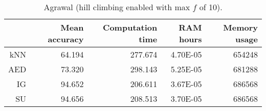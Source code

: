 \begin{table}[h]
\centering
\begin{tabular}{r|rrrr}
    & Mean accuracy  & Computation time & RAM hours & Memory usage \\ \hline
kNN & 64.194                   & 277.674          & 4.70E-05  & 654248       \\
AED & 73.320                   & 298.143          & 5.25E-05  & 681288       \\
IG  & 94.652                   & 206.611          & 3.67E-05  & 686568       \\
SU  & 94.656                   & 208.513          & 3.70E-05  & 686568      
\end{tabular}
\caption{Agrawal (hill climbing enabled with max $f$ of 10).}
\label{Table:Agrawal_H}
\end{table}